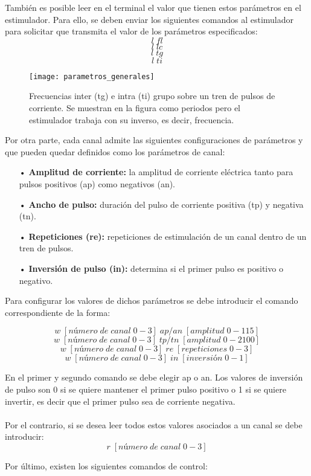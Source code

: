 También es posible leer en el terminal el valor que tienen estos parámetros en el estimulador. Para ello, se deben enviar los siguientes comandos al estimulador para solicitar que transmita el valor de los parámetros especificados:
$$l\;fl$$
$$l\;lc$$
$$l\;tg$$
$$l\;ti$$

\begin{figure}[!htb]
\centering
\texttt{[image: parametros\_generales]}
  \caption{Frecuencias inter (tg) e intra (ti) grupo sobre un tren de pulsos de corriente. Se muestran en la figura como periodos pero el estimulador trabaja con su inverso, es decir, frecuencia.}\label{fig:parametros_generales}
\end{figure}

Por otra parte, cada canal admite las siguientes configuraciones de parámetros y que pueden quedar definidos como los parámetros de canal:

\begin{itemize}
\item[•] \textbf{Amplitud de corriente:} la amplitud de corriente eléctrica tanto para pulsos positivos (ap) como negativos (an).
\item[•] \textbf{Ancho de pulso:} duración del pulso de corriente positiva (tp) y negativa (tn).
\item[•] \textbf{Repeticiones (re):} repeticiones de estimulación de un canal dentro de un tren de pulsos.
\item[•] \textbf{Inversión de pulso (in):} determina si el primer pulso es positivo o negativo.
\end{itemize}

Para configurar los valores de dichos parámetros se debe introducir el comando correspondiente de la forma:

$$w\;[número\;de\;canal\;0-3]\;ap/an\;[amplitud\;0-115]$$
$$w\;[número\;de\;canal\;0-3]\;tp/tn\;[amplitud\;0-2100]$$
$$w\;[número\;de\;canal\;0-3]\;re\;[repeticiones\;0-3]$$
$$w\;[número\;de\;canal\;0-3]\;in\;[inversión\;0-1]$$

En el primer y segundo comando se debe elegir ap o an. Los valores de inversión de pulso son 0 si se quiere mantener el primer pulso positivo o 1 si se quiere invertir, es decir que el primer pulso sea de corriente negativa.
\\
\\
Por el contrario, si se desea leer todos estos valores asociados a un canal se debe introducir:
$$r\;[número\;de\;canal\;0-3]$$

Por último, existen los siguientes comandos de control:

